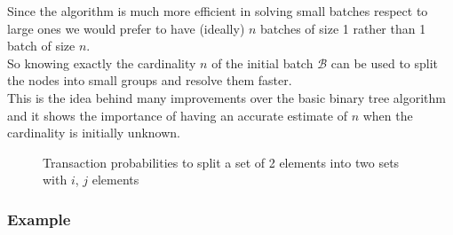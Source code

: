 \documentclass[12pt,a4paper,twocolumns]{report}
\begin{document}
Since the algorithm is much more efficient in solving small batches respect to large ones we would prefer to have (ideally)  $n$ batches of size 1 rather than 1 batch of size $n$.\\
So knowing exactly the cardinality $n$ of the initial batch $\mathcal{B}$ can be used to split the nodes into small groups and resolve them faster. \\This is the idea behind many improvements over the basic binary tree algorithm and it shows the importance of having an accurate estimate of $n$ when the cardinality is initially unknown.

\begin{figure}
\centering
{}
\caption[Set split probabilities]{Transaction probabilities to split a set of 2 elements into two sets with $i$, $j$ elements}
\end{figure}

\subsubsection{Example}
\end{document}
